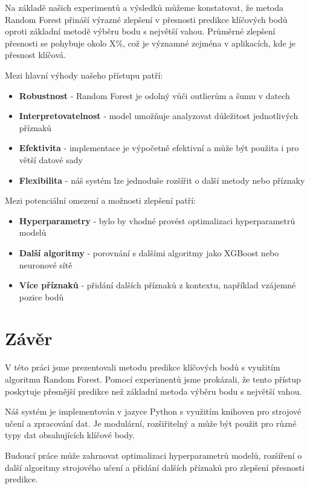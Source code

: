 \documentclass[a4paper,12pt]{article}
\begin{document}
Na základě našich experimentů a výsledků můžeme konstatovat, že metoda Random Forest přináší výrazné zlepšení v přesnosti predikce klíčových bodů oproti základní metodě výběru bodu s největší vahou. Průměrné zlepšení přesnosti se pohybuje okolo X\%, což je významné zejména v aplikacích, kde je přesnost klíčová.

Mezi hlavní výhody našeho přístupu patří:

\begin{itemize}
    \item \textbf{Robustnost} - Random Forest je odolný vůči outlierům a šumu v datech
    \item \textbf{Interpretovatelnost} - model umožňuje analyzovat důležitost jednotlivých příznaků
    \item \textbf{Efektivita} - implementace je výpočetně efektivní a může být použita i pro větší datové sady
    \item \textbf{Flexibilita} - náš systém lze jednoduše rozšířit o další metody nebo příznaky
\end{itemize}

Mezi potenciální omezení a možnosti zlepšení patří:

\begin{itemize}
    \item \textbf{Hyperparametry} - bylo by vhodné provést optimalizaci hyperparametrů modelů
    \item \textbf{Další algoritmy} - porovnání s dalšími algoritmy jako XGBoost nebo neuronové sítě
    \item \textbf{Více příznaků} - přidání dalších příznaků z kontextu, například vzájemné pozice bodů
\end{itemize}

\section{Závěr}
\label{sec:conclusion}

V této práci jsme prezentovali metodu predikce klíčových bodů s využitím algoritmu Random Forest. Pomocí experimentů jsme prokázali, že tento přístup poskytuje přesnější predikce než základní metoda výběru bodu s největší vahou.

Náš systém je implementován v jazyce Python s využitím knihoven pro strojové učení a zpracování dat. Je modulární, rozšiřitelný a může být použit pro různé typy dat obsahujících klíčové body.

Budoucí práce může zahrnovat optimalizaci hyperparametrů modelů, rozšíření o další algoritmy strojového učení a přidání dalších příznaků pro zlepšení přesnosti predikce.
\end{document}

